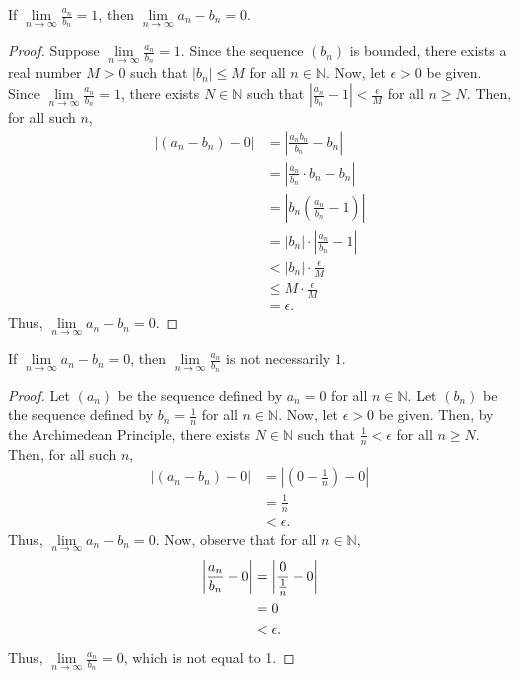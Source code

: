 \documentclass[12pt]{article}
\begin{document}
\medskip
{} If $\lim\limits_{n\to\infty}\frac{a_n}{b_n} = 1$, then $\lim\limits_{n\to\infty}a_n-b_n = 0$.
\begin{proof}
    Suppose $\lim\limits_{n\to\infty}\frac{a_n}{b_n} = 1$. Since the sequence $(b_n)$ is bounded, there exists a real number $M > 0$ such that $|b_n| \leq M$ for all $n \in \mathbb N$. Now, let $\epsilon > 0$ be given. Since $\lim\limits_{n\to\infty}\frac{a_n}{b_n} = 1$, there exists $N \in \mathbb N$ such that $|\frac{a_n}{b_n} - 1| < \frac\epsilon M$ for all $n \geq N$. Then, for all such $n$,
    \begin{align*}
        |(a_n - b_n) - 0| &= |\frac{a_nb_n}{b_n} - b_n| \\
                          &= |\frac{a_n}{b_n} \cdot b_n - b_n| \\
                          &= |b_n(\frac{a_n}{b_n} - 1)| \\
                          &= |b_n| \cdot |\frac{a_n}{b_n} - 1| \\
                          &< |b_n| \cdot \frac\epsilon M \\
                          &\leq M \cdot \frac\epsilon M \\
                          &= \epsilon.
    \end{align*}
    Thus, $\lim\limits_{n\to\infty}a_n-b_n = 0$.
\end{proof}

\newpage
{} If $\lim\limits_{n\to\infty}a_n-b_n = 0$, then $\lim\limits_{n\to\infty}\frac{a_n}{b_n}$ is not necessarily $1$.
\begin{proof}
    Let $(a_n)$ be the sequence defined by $a_n = 0$ for all $n \in \mathbb N$. Let $(b_n)$ be the sequence defined by $b_n = \frac1n$ for all $n \in \mathbb N$. Now, let $\epsilon > 0$ be given. Then, by the Archimedean Principle, there exists $N \in \mathbb N$ such that $\frac1n < \epsilon$ for all $n \geq N$. Then, for all such $n$, 
    \begin{align*}
        |(a_n - b_n) - 0| &= |(0 - \frac1n) - 0| \\
                    &= \frac1n \\
                    &< \epsilon.
    \end{align*}
    Thus, $\lim\limits_{n\to\infty} a_n - b_n = 0$. Now, observe that for all $n \in \mathbb N$,
    \begin{align*}
        \bigg{|}\frac{a_n}{b_n} - 0\bigg{|} &= \bigg{|}\frac0{\frac1n} - 0\bigg{|} \\
                              &= 0 \\
                              &< \epsilon.
    \end{align*}
    Thus, $\lim\limits_{n\to\infty} \frac{a_n}{b_n} = 0$, which is not equal to 1.
\end{proof}
\end{document}

